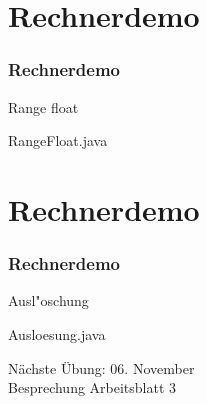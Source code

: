 \documentclass[9pt,german]{beamer}%
\begin{document}
\setcounter{exercise}{7}


\def\stitle{Rechnerdemo}
\section{\stitle}
\begin{frame}[fragile]%
  \frametitle{\stitle}%
\medskip

Range float

{RangeFloat.java}
\end{frame}



\def\stitle{Rechnerdemo}
\section{\stitle}
\begin{frame}[fragile]%
  \frametitle{\stitle}%
\medskip

Ausl"oschung

{Ausloesung.java}
\end{frame}


\setcounter{exercise}{8}


\setcounter{exercise}{9}


\begin{frame}
\centering
\Huge{}
\vspace{2cm}

{\LARGE
N\"achste \"Ubung: 06. November\\
Besprechung Arbeitsblatt 3
}
\end{frame}


\end{document}
